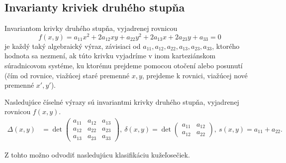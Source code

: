 \subsection{Invarianty kriviek druhého stupňa}
\begin{definition}
Invariantom krivky druhého stupňa, vyjadrenej rovnicou
$$
f(x, y) = a_{11}x^2 + 2a_{12}xy + a_{22}y^2 + 2a_{13}x + 2a_{23}y + a_{33} = 0
$$
je každý taký algebraický výraz, závisiaci od \(a_{11}, a_{12}, a_{22}, a_{13}, a_{23}, a_{33}\), ktorého hodnota sa nezmení, ak túto krivku vyjadríme v inom karteziánskom súradnicovom systéme, ku ktorému prejdeme pomocou otočení alebo posunutí (čím od rovnice, viažúcej staré premenné \(x, y\), prejdeme k rovnici, viažúcej nové premenné \(x', y'\)).
\end{definition}

\begin{theorem}
Nasledujúce číselné výrazy sú invariantmi krivky druhého stupňa, vyjadrenej rovnicou $f(x, y)$.
\begin{align*}
\Delta(x,y) &= \det \begin{pmatrix} 
a_{11} & a_{12} & a_{13} \\ 
a_{12} & a_{22} & a_{23} \\
a_{13} & a_{23} & a_{33} \end{pmatrix}, \
\delta(x,y) = \det \begin{pmatrix} a_{11} & a_{12} \\ a_{12} & a_{22} \end{pmatrix}, \
s(x,y) = a_{11} + a_{22}.
\end{align*}
\end{theorem}
Z tohto možno odvodiť nasledujúcu klasifikáciu kužeľosečiek.


